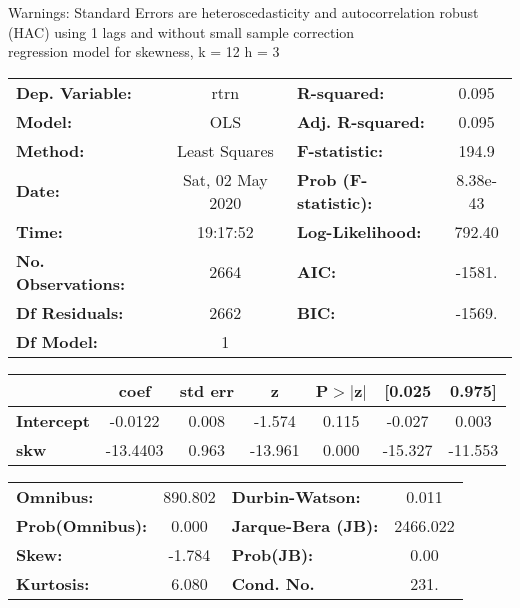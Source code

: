 Warnings: \newline
 [1] Standard Errors are heteroscedasticity and autocorrelation robust (HAC) using 1 lags and without small sample correction\\ 

regression model for skewness, k = 12 h = 3\begin{center}
\begin{tabular}{lclc}
\toprule
\textbf{Dep. Variable:}    &       rtrn       & \textbf{  R-squared:         } &     0.095   \\
\textbf{Model:}            &       OLS        & \textbf{  Adj. R-squared:    } &     0.095   \\
\textbf{Method:}           &  Least Squares   & \textbf{  F-statistic:       } &     194.9   \\
\textbf{Date:}             & Sat, 02 May 2020 & \textbf{  Prob (F-statistic):} &  8.38e-43   \\
\textbf{Time:}             &     19:17:52     & \textbf{  Log-Likelihood:    } &    792.40   \\
\textbf{No. Observations:} &        2664      & \textbf{  AIC:               } &    -1581.   \\
\textbf{Df Residuals:}     &        2662      & \textbf{  BIC:               } &    -1569.   \\
\textbf{Df Model:}         &           1      & \textbf{                     } &             \\
\bottomrule
\end{tabular}
\begin{tabular}{lcccccc}
                   & \textbf{coef} & \textbf{std err} & \textbf{z} & \textbf{P$> |$z$|$} & \textbf{[0.025} & \textbf{0.975]}  \\
\midrule
\textbf{Intercept} &      -0.0122  &        0.008     &    -1.574  &         0.115        &       -0.027    &        0.003     \\
\textbf{skw}       &     -13.4403  &        0.963     &   -13.961  &         0.000        &      -15.327    &      -11.553     \\
\bottomrule
\end{tabular}
\begin{tabular}{lclc}
\textbf{Omnibus:}       & 890.802 & \textbf{  Durbin-Watson:     } &    0.011  \\
\textbf{Prob(Omnibus):} &   0.000 & \textbf{  Jarque-Bera (JB):  } & 2466.022  \\
\textbf{Skew:}          &  -1.784 & \textbf{  Prob(JB):          } &     0.00  \\
\textbf{Kurtosis:}      &   6.080 & \textbf{  Cond. No.          } &     231.  \\
\bottomrule
\end{tabular}
\end{center}

